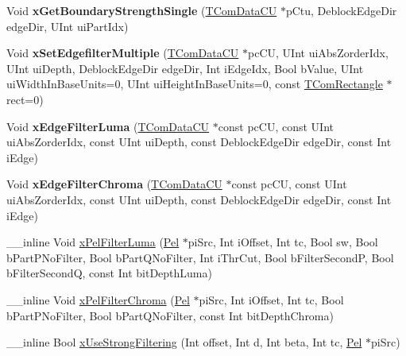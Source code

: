 \begin{DoxyCompactItemize}
Void {\bfseries x\+Get\+Boundary\+Strength\+Single} (\hyperlink{class_t_com_data_c_u}{T\+Com\+Data\+CU} $\ast$p\+Ctu, Deblock\+Edge\+Dir edge\+Dir, U\+Int ui\+Part\+Idx)
\item 
\mbox{\label{class_t_com_loop_filter_a1c2b054e6d23a752ec6cd79bfe60bfd0}} 
Void {\bfseries x\+Set\+Edgefilter\+Multiple} (\hyperlink{class_t_com_data_c_u}{T\+Com\+Data\+CU} $\ast$pc\+CU, U\+Int ui\+Abs\+Zorder\+Idx, U\+Int ui\+Depth, Deblock\+Edge\+Dir edge\+Dir, Int i\+Edge\+Idx, Bool b\+Value, U\+Int ui\+Width\+In\+Base\+Units=0, U\+Int ui\+Height\+In\+Base\+Units=0, const \hyperlink{struct_t_com_rectangle}{T\+Com\+Rectangle} $\ast$rect=0)
\item 
\mbox{\label{class_t_com_loop_filter_aefe0982634437078f939ae07ab397596}} 
Void {\bfseries x\+Edge\+Filter\+Luma} (\hyperlink{class_t_com_data_c_u}{T\+Com\+Data\+CU} $\ast$const pc\+CU, const U\+Int ui\+Abs\+Zorder\+Idx, const U\+Int ui\+Depth, const Deblock\+Edge\+Dir edge\+Dir, const Int i\+Edge)
\item 
\mbox{\label{class_t_com_loop_filter_aa2c3a17cf94a658d907ad7b67e29d154}} 
Void {\bfseries x\+Edge\+Filter\+Chroma} (\hyperlink{class_t_com_data_c_u}{T\+Com\+Data\+CU} $\ast$const pc\+CU, const U\+Int ui\+Abs\+Zorder\+Idx, const U\+Int ui\+Depth, const Deblock\+Edge\+Dir edge\+Dir, const Int i\+Edge)
\item 
\+\_\+\+\_\+inline Void \hyperlink{class_t_com_loop_filter_a3caad5884d5fd7aaf54faa0c4b00ca29}{x\+Pel\+Filter\+Luma} (\hyperlink{_type_def_8h_af92141699657699b4b547be0c8517541}{Pel} $\ast$pi\+Src, Int i\+Offset, Int tc, Bool sw, Bool b\+Part\+P\+No\+Filter, Bool b\+Part\+Q\+No\+Filter, Int i\+Thr\+Cut, Bool b\+Filter\+SecondP, Bool b\+Filter\+SecondQ, const Int bit\+Depth\+Luma)
\item 
\+\_\+\+\_\+inline Void \hyperlink{class_t_com_loop_filter_a610728047ee14dc06ecaf40b77e5f0ba}{x\+Pel\+Filter\+Chroma} (\hyperlink{_type_def_8h_af92141699657699b4b547be0c8517541}{Pel} $\ast$pi\+Src, Int i\+Offset, Int tc, Bool b\+Part\+P\+No\+Filter, Bool b\+Part\+Q\+No\+Filter, const Int bit\+Depth\+Chroma)
\item 
\+\_\+\+\_\+inline Bool \hyperlink{class_t_com_loop_filter_abda3d54527317184fe88b377e1b89885}{x\+Use\+Strong\+Filtering} (Int offset, Int d, Int beta, Int tc, \hyperlink{_type_def_8h_af92141699657699b4b547be0c8517541}{Pel} $\ast$pi\+Src)

\end{DoxyCompactItemize}
